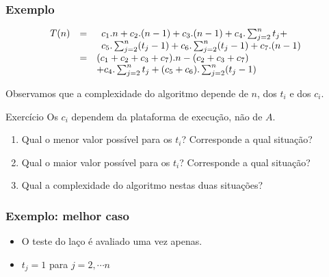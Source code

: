 \documentclass{beamer}
\begin{document}
\begin{frame}
  \frametitle{Exemplo}

  $$
  \begin{array}{rcl}
    T(n) & = & \begin{array}[t]{l}
      c_1.n+c_2.(n-1)+c_3.(n-1)+c_4.\sum_{j=2}^{n} t_j + \\
      c_5.\sum_{j=2}^{n} (t_j-1) + c_6.\sum_{j=2}^{n} (t_j-1)+c_7.(n-1) \\
      \end{array} \\
    & = & (c_1+c_2+c_3+c_7).n  - (c_2 + c_3 + c_7) \\
    & & + c_4.\sum_{j=2}^{n} t_j+ (c_5+c_6).\sum_{j=2}^{n} (t_j-1)
  \end{array}
  $$

  Observamos que a complexidade do algoritmo depende de $n$, dos $t_i$ e dos
  $c_i$.
  \pause
  \begin{block}{Exercício}
    Os $c_i$ dependem da plataforma de execução, não de $A$.
    \begin{enumerate}
    \item Qual o menor valor possível para os $t_i$? Corresponde a qual situação?
    \item Qual o maior valor possível para os $t_i$? Corresponde a qual situação?
    \item Qual a complexidade do algoritmo nestas duas situações?
    \end{enumerate}
  \end{block}

\end{frame}

\begin{frame}

\frametitle{Exemplo: melhor caso}

  

  \begin{itemize}
    \item O teste do laço é avaliado uma vez apenas.
    \item $t_j = 1$ para $j = 2, \cdots n$
  \end{itemize}

\end{frame}
\end{document}
